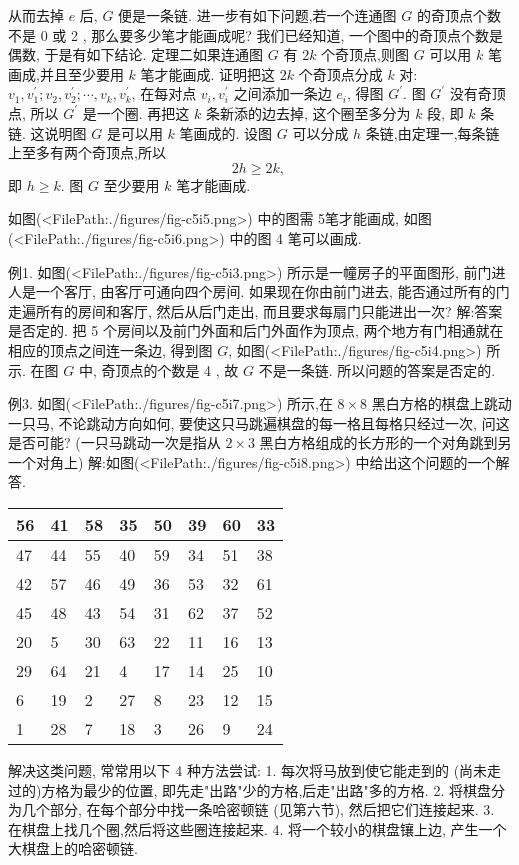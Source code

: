 从而去掉 $e$ 后, $G$ 便是一条链.
进一步有如下问题,若一个连通图 $G$ 的奇顶点个数不是 0 或 2 , 那么要多少笔才能画成呢? 我们已经知道, 一个图中的奇顶点个数是偶数, 于是有如下结论.
定理二如果连通图 $G$ 有 $2 k$ 个奇顶点,则图 $G$ 可以用 $k$ 笔画成,并且至少要用 $k$ 笔才能画成.
证明把这 $2 k$ 个奇顶点分成 $k$ 对: $v_1, v_1^{\prime} ; v_2, v_2^{\prime} ; \cdots, v_k, v_k^{\prime}$, 在每对点 $v_i, v_i^{\prime}$ 之间添加一条边 $e_i$, 得图 $G^{\prime}$. 图 $G^{\prime}$ 没有奇顶点, 所以 $G^{\prime}$ 是一个圈.
再把这 $k$ 条新添的边去掉, 这个圈至多分为 $k$ 段, 即 $k$ 条链.
这说明图 $G$ 是可以用 $k$ 笔画成的.
设图 $G$ 可以分成 $h$ 条链,由定理一,每条链上至多有两个奇顶点,所以
$$
2 h \geqslant 2 k \text {, }
$$
即 $h \geqslant k$. 图 $G$ 至少要用 $k$ 笔才能画成.



如图(<FilePath:./figures/fig-c5i5.png>) 中的图需 5笔才能画成, 如图(<FilePath:./figures/fig-c5i6.png>) 中的图 4 笔可以画成.



例1. 如图(<FilePath:./figures/fig-c5i3.png>) 所示是一幢房子的平面图形, 前门进人是一个客厅, 由客厅可通向四个房间.
如果现在你由前门进去, 能否通过所有的门走遍所有的房间和客厅, 然后从后门走出, 而且要求每扇门只能进出一次?
解:答案是否定的.
把 5 个房间以及前门外面和后门外面作为顶点, 两个地方有门相通就在相应的顶点之间连一条边, 得到图 $G$, 如图(<FilePath:./figures/fig-c5i4.png>) 所示.
在图 $G$ 中, 奇顶点的个数是 4 , 故 $G$ 不是一条链.
所以问题的答案是否定的.



例3. 如图(<FilePath:./figures/fig-c5i7.png>) 所示,在 $8 \times 8$ 黑白方格的棋盘上跳动一只马, 不论跳动方向如何, 要使这只马跳遍棋盘的每一格且每格只经过一次, 问这是否可能? (一只马跳动一次是指从 $2 \times 3$ 黑白方格组成的长方形的一个对角跳到另一个对角上)
解:如图(<FilePath:./figures/fig-c5i8.png>) 中给出这个问题的一个解答.
\begin{tabular}{|l|l|l|l|l|l|l|l|}
\hline 56 & 41 & 58 & 35 & 50 & 39 & 60 & 33 \\
\hline 47 & 44 & 55 & 40 & 59 & 34 & 51 & 38 \\
\hline 42 & 57 & 46 & 49 & 36 & 53 & 32 & 61 \\
\hline 45 & 48 & 43 & 54 & 31 & 62 & 37 & 52 \\
\hline 20 & 5 & 30 & 63 & 22 & 11 & 16 & 13 \\
\hline 29 & 64 & 21 & 4 & 17 & 14 & 25 & 10 \\
\hline 6 & 19 & 2 & 27 & 8 & 23 & 12 & 15 \\
\hline 1 & 28 & 7 & 18 & 3 & 26 & 9 & 24 \\
\hline
\end{tabular}
解决这类问题, 常常用以下 4 种方法尝试:
1. 每次将马放到使它能走到的 (尚未走过的)方格为最少的位置, 即先走"出路"少的方格,后走"出路"多的方格.
2. 将棋盘分为几个部分, 在每个部分中找一条哈密顿链 (见第六节), 然后把它们连接起来.
3. 在棋盘上找几个圈,然后将这些圈连接起来.
4. 将一个较小的棋盘镶上边, 产生一个大棋盘上的哈密顿链.




